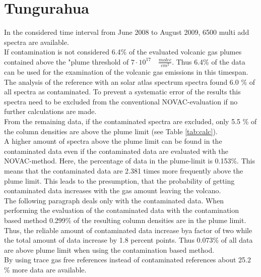 \documentclass  [
  paper    = a4,
  BCOR     = 10mm,
  twoside,
  fontsize = 12pt,
  fleqn,
  toc      = bibnumbered,
  toc      = listofnumbered,
  numbers  = noendperiod,
  headings = normal,
  listof   = leveldown,
  version  = 3.03
]                                       {scrreprt}
\begin{document}
\section{Tungurahua}
	In the considered time interval from June 2008 to August 2009, 6500 multi add spectra are available. \\
	If contamination is not considered
	6.4\% of the evaluated volcanic gas plumes contained  above the "plume threshold of $7\cdot10^{17}\quad \frac{molec}{cm^2}$. Thus 6.4\% of the data can be used for the examination of the volcanic gas emissions in this timespan.\\
 	The analysis of the reference with an solar atlas spectrum spectra found 6.0 \% of all spectra as contaminated. To prevent a systematic error of the results this spectra need to be excluded from the conventional NOVAC-evaluation if no further calculations are made.\\
 	From the remaining data,  if the contaminated spectra are excluded, only 5.5 \% of the   column densities are above the plume limit  (see  Table \ref{tab:calc}). \\
 	A higher amount of spectra above the   plume limit can be found in the contaminated data even if the contaminated data are evaluated with the NOVAC-method. Here, the percentage of data in the plume-limit is 0.153\%.
 	This means that the contaminated data are 2.381 times more frequently above the plume limit. This leads to the presumption, that the probability of getting contaminated data increases with the gas amount leaving the volcano.\\
 	The following paragraph deals only with the contaminated data.	
 	When performing the evaluation of the contaminated data with the contamination based method 0.299\% of the resulting   column densities are in the plume limit. Thus, the reliable amount of contaminated data increase bya factor of two while the total amount of data increase by 1.8 percent points. Thus 0.073\% of all data are above plume limit when using the contamination based method.\\
 	By using trace gas free references instead of contaminated references about 25.2 \% more data are available. \\

	
\end{document}
